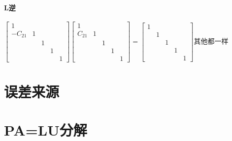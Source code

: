 \documentclass[UTF8,a4paper,12pt,scheme=chinese]{ctexbook}
\theoremstyle{plain}
\begin{document}
	 \paragraph{L逆}
	 $ \left[\begin{array}{ccccc}
	 1\\
	 -C_{21}&1\\
	 &&1\\
	 &&&1\\
	 &&&&1
	 \end{array}\right]
	 \left[\begin{array}{ccccc}
	 1\\
	 C_{21}&1\\
	 &&1\\
	 &&&1\\
	 &&&&1
	 \end{array}\right]
	 =
	 \left[\begin{array}{ccccc}
	 1\\
	 &1\\
	 &&1\\
	 &&&1\\
	 &&&&1
	 \end{array}\right] $其他都一样
	\section{误差来源}
	\section{PA=LU分解}
	
\end{document}
